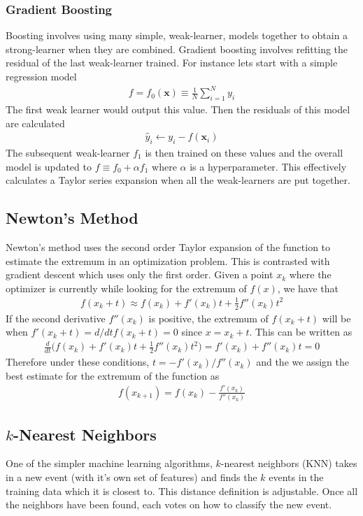 \subsubsection{Gradient Boosting}
Boosting involves using many simple, weak-learner, models together to obtain a strong-learner when they are combined. Gradient boosting involves refitting the residual of the last weak-learner trained. For instance lets start with a simple regression model
\begin{align}
    f = f_0(\textbf{x}) \equiv \frac{1}{N}\sum_{i=1}^N y_i
\end{align}
The first weak learner would output this value. Then the residuals of this model are calculated
\begin{align}
    \hat{y}_i \leftarrow y_i - f(\textbf{x}_i)
\end{align}
The subsequent weak-learner $f_1$ is then trained on these values and the overall model is updated to $f \equiv f_0 + \alpha f_1$ where $\alpha$ is a hyperparameter. This effectively calculates a Taylor series expansion when all the weak-learners are put together.

\subsection{Newton's Method}
Newton's method uses the second order Taylor expansion of the function to estimate the extremum in an optimization problem. This is contrasted with gradient descent which uses only the first order. Given a point $x_k$ where the optimizer is currently while looking for the extremum of $f(x)$, we have that
\begin{align}
	f(x_k+t)\approx f(x_k) + f'(x_k)t + \frac{1}{2}f''(x_k)t^2
\end{align}
If the second derivative $f''(x_k)$ is positive, the extremum of $f(x_k+t)$ will be when $f'(x_k+t) = d/dt f(x_k+t) = 0$ since $x=x_k+t$. This can be written as 
\begin{align}
	\frac{d}{dt}\Big( f(x_k) + f'(x_k)t + \frac{1}{2}f''(x_k)t^2\Big) = f'(x_k)+f''(x_k)t = 0 
\end{align}
Therefore under these conditions, $t = -f'(x_k)/f''(x_k)$ and the we assign the best estimate for the extremum of the function as
\begin{align}
	f(x_{k+1}) = f(x_k)-\frac{f'(x_k)}{f''(x_k)}
\end{align} 


\subsection{$k$-Nearest Neighbors}\label{sub:knn}
One of the simpler machine learning algorithms, $k$-nearest neighbors (KNN) takes in a new event (with it's own set of features) and finds the  $k$ events in the training data which it is closest to. This distance definition is adjustable. Once all the neighbors have been found, each votes on how to classify the new event.

